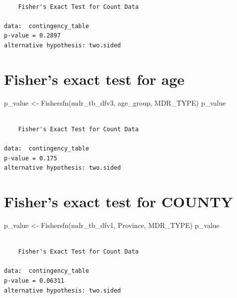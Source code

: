 \documentclass[
]{report}
\newenvironment{Shaded}{\begin{snugshade}}{\end{snugshade}}
\newcommand{\FunctionTok}[1]{\textcolor[rgb]{0.28,0.35,0.67}{#1}}
\newcommand{\NormalTok}[1]{\textcolor[rgb]{0.00,0.23,0.31}{#1}}
\newcommand{\OtherTok}[1]{\textcolor[rgb]{0.00,0.23,0.31}{#1}}
\newcommand{\StringTok}[1]{\textcolor[rgb]{0.13,0.47,0.30}{#1}}
\begin{document}
\begin{verbatim}

    Fisher's Exact Test for Count Data

data:  contingency_table
p-value = 0.2897
alternative hypothesis: two.sided
\end{verbatim}

\hypertarget{fishers-exact-test-for-age}{%
\section{Fisher's exact test for age}\label{fishers-exact-test-for-age}}

\begin{Shaded}
\begin{Highlighting}[]
\NormalTok{p\_value }\OtherTok{\textless{}{-}} \FunctionTok{Fishersfn}\NormalTok{(mdr\_tb\_dfv3, }\StringTok{\textquotesingle{}age\_group\textquotesingle{}}\NormalTok{, }\StringTok{\textquotesingle{}MDR\_TYPE\textquotesingle{}}\NormalTok{)}
\NormalTok{p\_value }
\end{Highlighting}
\end{Shaded}

\begin{verbatim}

    Fisher's Exact Test for Count Data

data:  contingency_table
p-value = 0.175
alternative hypothesis: two.sided
\end{verbatim}

\hypertarget{fishers-exact-test-for-county}{%
\section{Fisher's exact test for
COUNTY}\label{fishers-exact-test-for-county}}

\begin{Shaded}
\begin{Highlighting}[]
\NormalTok{p\_value }\OtherTok{\textless{}{-}} \FunctionTok{Fishersfn}\NormalTok{(mdr\_tb\_dfv1, }\StringTok{\textquotesingle{}Province\textquotesingle{}}\NormalTok{, }\StringTok{\textquotesingle{}MDR\_TYPE\textquotesingle{}}\NormalTok{)}
\NormalTok{p\_value}
\end{Highlighting}
\end{Shaded}

\begin{verbatim}

    Fisher's Exact Test for Count Data

data:  contingency_table
p-value = 0.06311
alternative hypothesis: two.sided
\end{verbatim}
\end{document}
